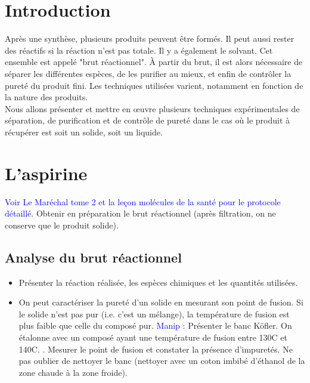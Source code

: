 \documentclass[11pt,a4paper]{report}
\begin{document}
\newpage
\section*{Introduction}

Après une synthèse, plusieurs produits peuvent être formés. Il peut aussi rester des réactifs si la réaction n'est pas totale. Il y a également le solvant. Cet ensemble est appelé "brut réactionnel". \`A partir du brut, il est alors nécessaire de séparer les différentes espèces, de les purifier au mieux, et enfin de contrôler la pureté du produit fini. Les techniques utilisées varient, notamment en fonction de la nature des produits.\\

Nous allons présenter et mettre en œuvre plusieurs techniques expérimentales de séparation, de purification et de contrôle de pureté dans le cas où le produit à récupérer est soit un solide, soit un liquide.

\section{L'aspirine}\label{sec:1}

\textcolor{blue}{Voir Le Maréchal tome 2 et la leçon molécules de la santé pour le protocole détaillé.}
Obtenir en préparation le brut réactionnel (après filtration, on ne conserve que le produit solide).

\subsection{Analyse du brut réactionnel}

\begin{itemize}
	\item Présenter la réaction réalisée, les espèces chimiques et les quantités utilisées.\\
	
	\item On peut caractériser la pureté d'un solide en mesurant son point de fusion. Si le solide 			n'est pas pur (i.e. c'est un mélange), la température de fusion est plus faible que celle du 			composé pur. \textcolor{blue}{Manip :} Présenter le banc Köfler. On étalonne avec un composé ayant 		une température de fusion entre 130\degree C et 140\degree C. . Mesurer le point de fusion et 			constater la présence d'impuretés. Ne pas oublier de nettoyer le banc (nettoyer avec un coton 			imbibé d'éthanol de la zone chaude à la zone froide).
\end{itemize}
\end{document}

